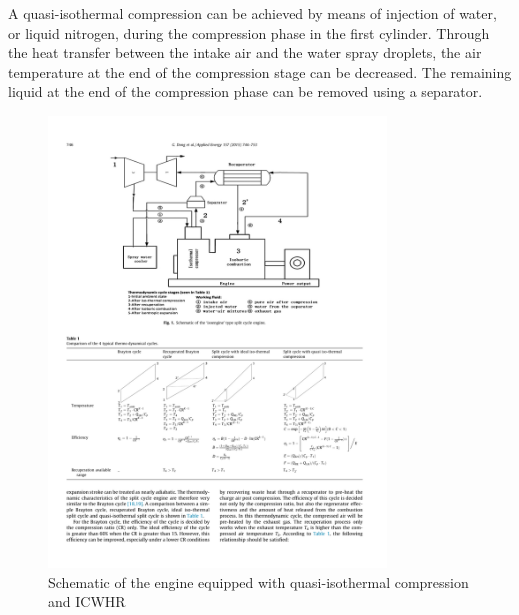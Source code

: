 A quasi-isothermal compression can be achieved by means of injection of water, or liquid nitrogen, during the compression phase in the first cylinder. Through the heat transfer between the intake air and the water spray droplets, the air temperature at the end of the compression stage can be decreased. The remaining liquid at the end of the compression phase can be removed using a separator.

\begin{figure}[ht]
  \centering
  \includegraphics[width=0.8\textwidth]{figures/review/split_ICWHR_layout.pdf}
  \caption{Schematic of the engine equipped with quasi-isothermal compression and ICWHR\label{fig:split_ICWHR_layout} }
\end{figure}

